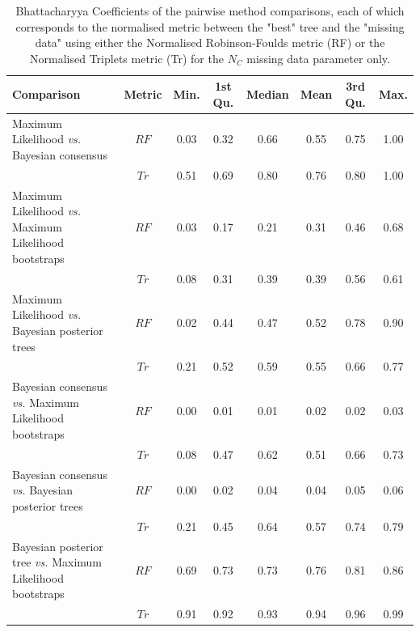 \documentclass[12pt,letterpaper]{article}
\begin{document}
\begin{landscape}
\begin{table}[ht]
\caption{Bhattacharyya Coefficients of the pairwise method comparisons, each of which corresponds to the normalised metric between the "best" tree and the "missing data" using either the Normalised Robinson-Foulds metric (RF) or the Normalised Triplets metric (Tr) for the $N_{C}$ missing data parameter only.}
\label{Tab_Supp_summary_BC_MC}
\centering
\begin{tabular}{lccccccc}
  \hline
 Comparison &  Metric & Min. & 1st Qu. & Median & Mean & 3rd Qu. & Max. \\  
  \hline
    Maximum Likelihood \textit{vs.} Bayesian consensus                 & $RF$ & 0.03 & 0.32 & 0.66 & 0.55 & 0.75 & 1.00 \\ 
                                                                       & $Tr$ & 0.51 & 0.69 & 0.80 & 0.76 & 0.80 & 1.00 \\ 
    Maximum Likelihood \textit{vs.} Maximum Likelihood bootstraps      & $RF$ & 0.03 & 0.17 & 0.21 & 0.31 & 0.46 & 0.68 \\ 
                                                                       & $Tr$ & 0.08 & 0.31 & 0.39 & 0.39 & 0.56 & 0.61 \\ 
    Maximum Likelihood \textit{vs.} Bayesian posterior trees           & $RF$ & 0.02 & 0.44 & 0.47 & 0.52 & 0.78 & 0.90 \\ 
                                                                       & $Tr$ & 0.21 & 0.52 & 0.59 & 0.55 & 0.66 & 0.77 \\ 
    Bayesian consensus \textit{vs.} Maximum Likelihood bootstraps      & $RF$ & 0.00 & 0.01 & 0.01 & 0.02 & 0.02 & 0.03 \\ 
                                                                       & $Tr$ & 0.08 & 0.47 & 0.62 & 0.51 & 0.66 & 0.73 \\ 
    Bayesian consensus \textit{vs.} Bayesian posterior trees           & $RF$ & 0.00 & 0.02 & 0.04 & 0.04 & 0.05 & 0.06 \\ 
                                                                       & $Tr$ & 0.21 & 0.45 & 0.64 & 0.57 & 0.74 & 0.79 \\ 
    Bayesian posterior tree \textit{vs.} Maximum Likelihood bootstraps & $RF$ & 0.69 & 0.73 & 0.73 & 0.76 & 0.81 & 0.86 \\ 
                                                                       & $Tr$ & 0.91 & 0.92 & 0.93 & 0.94 & 0.96 & 0.99 \\ 
   \hline
\end{tabular}
\end{table}
\end{landscape}
\end{document}

